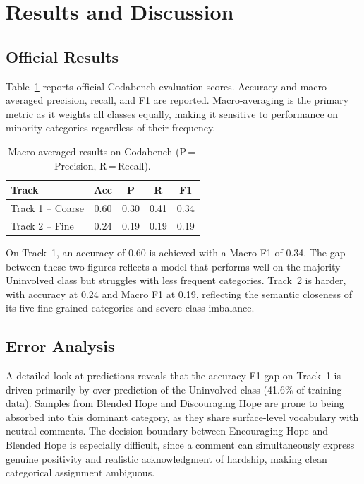 \documentclass[11pt]{article}
\begin{document}
\section{Results and Discussion}

\subsection{Official Results}
Table~\ref{tab:results} reports official Codabench evaluation scores. Accuracy and
macro-averaged precision, recall, and F1 are reported. Macro-averaging is the primary
metric as it weights all classes equally, making it sensitive to performance on
minority categories regardless of their frequency.

\begin{table}[H]
\centering\small
\setlength{\tabcolsep}{4pt}\renewcommand{\arraystretch}{1.1}
\begin{tabular}{lcccc}
\toprule
\rowcolor{headerblue}\textbf{Track} & \textbf{Acc} & \textbf{P} & \textbf{R} & \textbf{F1} \\
\midrule
Track 1 -- Coarse & 0.60 & 0.30 & 0.41 & 0.34 \\
Track 2 -- Fine   & 0.24 & 0.19 & 0.19 & 0.19 \\
\bottomrule
\end{tabular}
\caption{Macro-averaged results on Codabench (P\,=\,Precision, R\,=\,Recall).}
\label{tab:results}
\end{table}

On Track~1, an accuracy of 0.60 is achieved with a Macro F1 of 0.34. The gap
between these two figures reflects a model that performs well on the majority
Uninvolved class but struggles with less frequent categories. Track~2 is harder,
with accuracy at 0.24 and Macro F1 at 0.19, reflecting the semantic closeness of
its five fine-grained categories and severe class imbalance.

\subsection{Error Analysis}
A detailed look at predictions reveals that the accuracy-F1 gap on Track~1 is driven
primarily by over-prediction of the Uninvolved class (41.6\% of training data).
Samples from Blended Hope and Discouraging Hope are prone to being absorbed into
this dominant category, as they share surface-level vocabulary with neutral comments.
The decision boundary between Encouraging Hope and Blended Hope is especially
difficult, since a comment can simultaneously express genuine positivity and realistic
acknowledgment of hardship, making clean categorical assignment ambiguous.
\end{document}
